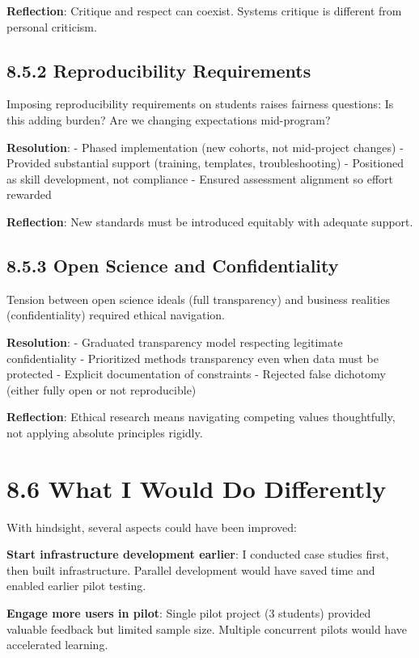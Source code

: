\documentclass[
  oneside,
  open=any]{scrbook}
\begin{document}
\textbf{Reflection}: Critique and respect can coexist. Systems critique
is different from personal criticism.

\subsection{8.5.2 Reproducibility
Requirements}\label{reproducibility-requirements}

Imposing reproducibility requirements on students raises fairness
questions: Is this adding burden? Are we changing expectations
mid-program?

\textbf{Resolution}: - Phased implementation (new cohorts, not
mid-project changes) - Provided substantial support (training,
templates, troubleshooting) - Positioned as skill development, not
compliance - Ensured assessment alignment so effort rewarded

\textbf{Reflection}: New standards must be introduced equitably with
adequate support.

\subsection{8.5.3 Open Science and
Confidentiality}\label{open-science-and-confidentiality}

Tension between open science ideals (full transparency) and business
realities (confidentiality) required ethical navigation.

\textbf{Resolution}: - Graduated transparency model respecting
legitimate confidentiality - Prioritized methods transparency even when
data must be protected - Explicit documentation of constraints -
Rejected false dichotomy (either fully open or not reproducible)

\textbf{Reflection}: Ethical research means navigating competing values
thoughtfully, not applying absolute principles rigidly.

\section{8.6 What I Would Do
Differently}\label{what-i-would-do-differently}

With hindsight, several aspects could have been improved:

\textbf{Start infrastructure development earlier}: I conducted case
studies first, then built infrastructure. Parallel development would
have saved time and enabled earlier pilot testing.

\textbf{Engage more users in pilot}: Single pilot project (3 students)
provided valuable feedback but limited sample size. Multiple concurrent
pilots would have accelerated learning.
\end{document}
